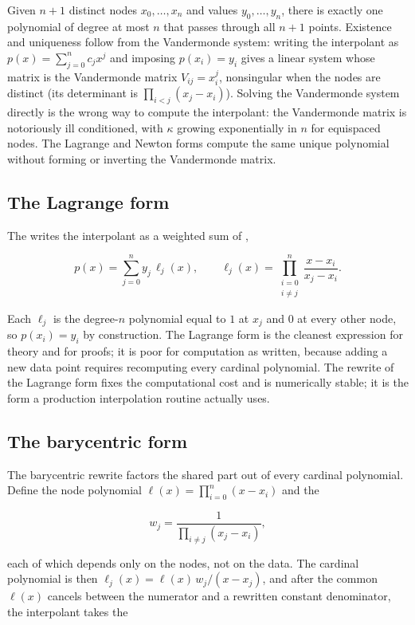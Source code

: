 Given $n + 1$ distinct nodes $x_{0}, \ldots, x_{n}$ and values
$y_{0}, \ldots, y_{n}$, there is exactly one polynomial of degree at
most $n$ that passes through all $n + 1$ points. Existence and
uniqueness follow from the Vandermonde system: writing the
interpolant as $p(x) = \sum_{j=0}^{n} c_{j} x^{j}$ and imposing
$p(x_{i}) = y_{i}$ gives a linear system whose matrix is the
Vandermonde matrix $V_{ij} = x_{i}^{j}$, nonsingular when the nodes
are distinct (its determinant is $\prod_{i < j}(x_{j} - x_{i})$).
Solving the Vandermonde system directly is the wrong way to compute
the interpolant: the Vandermonde matrix is notoriously ill
conditioned, with $\kappa$ growing exponentially in $n$ for
equispaced nodes. The Lagrange and Newton forms compute the same
unique polynomial without forming or inverting the Vandermonde
matrix.

\subsection{The Lagrange form}

The  writes the interpolant as a weighted
sum of ,

\[
p(x) = \sum_{j=0}^{n} y_{j} \, \ell_{j}(x), \qquad
\ell_{j}(x) = \prod_{\substack{i=0 \\ i \neq j}}^{n}
\frac{x - x_{i}}{x_{j} - x_{i}}.
\]

Each $\ell_{j}$ is the degree-$n$ polynomial equal to $1$ at
$x_{j}$ and $0$ at every other node, so $p(x_{i}) = y_{i}$ by
construction. The Lagrange form is the cleanest expression for
theory and for proofs; it is poor for computation as written,
because adding a new data point requires recomputing every cardinal
polynomial. The  rewrite of the Lagrange form
fixes the computational cost and is numerically stable; it is the
form a production interpolation routine actually uses.

\subsection{The barycentric form}

The barycentric rewrite factors the shared part out of every cardinal
polynomial. Define the node polynomial $\ell(x) = \prod_{i=0}^{n}(x - x_{i})$
and the 

\[
w_{j} = \frac{1}{\prod_{i \neq j}(x_{j} - x_{i})},
\]

each of which depends only on the nodes, not on the data. The cardinal
polynomial is then $\ell_{j}(x) = \ell(x)\, w_{j}/(x - x_{j})$, and after the
common $\ell(x)$ cancels between the numerator and a rewritten constant
denominator, the interpolant takes the 

